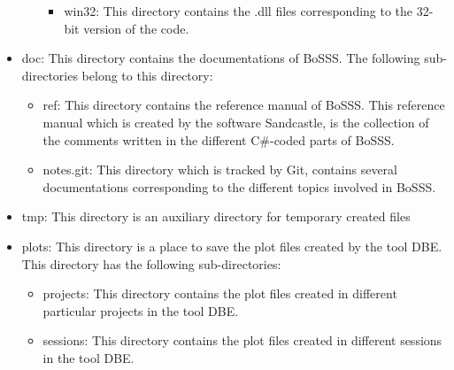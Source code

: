 \documentclass[11pt,twoside,a4paper]{fdyartcl}
\begin{document}
\begin{itemize}
\begin{itemize}
        \begin{itemize}
        \item win32: This directory contains the {\scriptsize .dll} files corresponding to the 32-bit version of the code.
        \end{itemize}
    \end{itemize}
\item doc: This directory contains the documentations of BoSSS. The following sub-directories belong to this directory:
    \begin{itemize}
    \item ref: This directory contains the reference manual of BoSSS. This reference manual which is created by the software Sandcastle, is the collection of the comments written in the different C\#-coded parts of BoSSS.
    \item notes.git: This directory which is tracked by Git, contains several documentations corresponding to the different topics involved in BoSSS.
    \end{itemize}
\item tmp: This directory is an auxiliary directory for temporary created files
\item plots: This directory is a place to save the plot files created by the tool DBE. This directory has the following sub-directories:
    \begin{itemize}
    \item projects: This directory contains the plot files created in different particular projects in the tool DBE.
    \item sessions: This directory contains the plot files created in different sessions in the tool DBE.
    \end{itemize}
\end{itemize}
\end{document}
